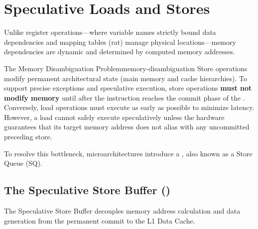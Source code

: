 \section{Speculative Loads and Stores}
\label{sec:speculative_load_stores}

Unlike register operations—where variable names strictly bound data dependencies and mapping tables (\gls{rat}) manage physical locations—memory dependencies are dynamic and determined by computed memory addresses.

\begin{concept}{The Memory Disambiguation Problem}{memory-disambiguation}
Store operations modify permanent architectural state (main memory and cache hierarchies). To support precise exceptions and speculative execution, store operations \textbf{must not modify memory} until after the instruction reaches the commit phase of the . 
Conversely, load operations must execute as early as possible to minimize latency. However, a load cannot safely execute speculatively unless the hardware guarantees that its target memory address does not alias with any uncommitted preceding store.
\end{concept}

To resolve this bottleneck, microarchitectures introduce a \textbf{}, also known as a Store Queue (SQ).

\subsection{The Speculative Store Buffer ()}

The Speculative Store Buffer decouples memory address calculation and data generation from the permanent commit to the L1 Data Cache.

